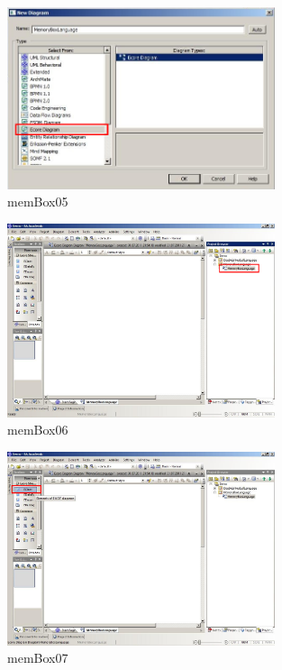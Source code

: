 \begin{figure}[htbp]
	\centering
  \includegraphics[width=0.7\textwidth]{pics/memBox05.png}
	\caption{memBox05}
	\label{memBox05}
\end{figure}

\begin{figure}[htbp]
	\centering
  \includegraphics[width=0.7\textwidth]{pics/memBox06.png}
	\caption{memBox06}
	\label{memBox06}
\end{figure}

\begin{figure}[htbp]
	\centering
  \includegraphics[width=0.7\textwidth]{pics/memBox07.png}
	\caption{memBox07}
	\label{memBox07}
\end{figure}

